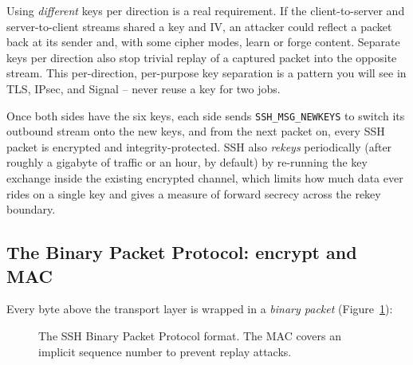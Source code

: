 \begin{trapbox}
Using \emph{different} keys per direction is a real requirement. If the client-to-server and server-to-client streams shared a key and IV, an attacker could reflect a packet back at its sender and, with some cipher modes, learn or forge content. Separate keys per direction also stop trivial replay of a captured packet into the opposite stream. This per-direction, per-purpose key separation is a pattern you will see in TLS, IPsec, and Signal -- never reuse a key for two jobs.
\end{trapbox}

Once both sides have the six keys, each side sends \texttt{SSH\_MSG\_NEWKEYS} to switch its outbound stream onto the new keys, and from the next packet on, every SSH packet is encrypted and integrity-protected. SSH also \emph{rekeys} periodically (after roughly a gigabyte of traffic or an hour, by default) by re-running the key exchange inside the existing encrypted channel, which limits how much data ever rides on a single key and gives a measure of forward secrecy across the rekey boundary.

\subsection{The Binary Packet Protocol: encrypt and MAC}

Every byte above the transport layer is wrapped in a \emph{binary packet} (Figure~\ref{fig:ssh-binary-packet}):

\begin{figure}[htbp]
\centering
{}
\caption{The SSH Binary Packet Protocol format. The MAC covers an implicit sequence number to prevent replay attacks.}
\label{fig:ssh-binary-packet}
\end{figure}

